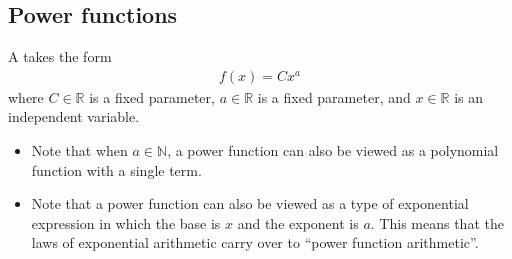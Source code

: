 \documentclass[letterpaper,10pt,english]{jupyterBook}
\begin{document}
\subsection{Power functions}
\label{\detokenize{03.mappings_functions_correspondences:power-functions}}
\sphinxAtStartPar
A  takes the form
\begin{equation*}
\begin{split}
f(x) = Cx^a
\end{split}
\end{equation*}
\sphinxAtStartPar
where \(C \in \mathbb{R}\) is a fixed parameter, \(a \in \mathbb{R}\) is a fixed parameter, and \(x \in \mathbb{R}\) is an independent variable.
\begin{itemize}
\item {} 
\sphinxAtStartPar
Note that when \(a \in \mathbb{N}\), a power function can also be viewed as a polynomial function with a single term.

\item {} 
\sphinxAtStartPar
Note that a power function can also be viewed as a type of exponential expression in which the base is \(x\) and the exponent is \(a\). This means that the laws of exponential arithmetic carry over to “power function arithmetic”.

\end{itemize}
\end{document}
